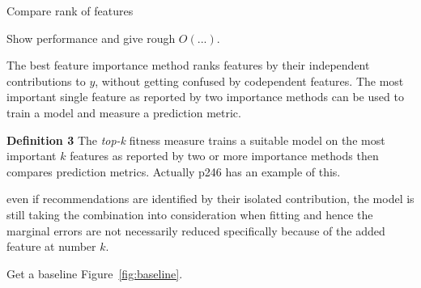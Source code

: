 \documentclass[11pt]{article}
\newcommand{\figref}[1]{Figure~\ref{#1}}
\newcommand{\todo}[1]{{{\color{red}{[#1]}}}}
\begin{document}
Compare rank of features

Show performance and give rough $O(...)$.

\todo{an experiment where we show insensitive to noise column and any other codependent ones that are thrown in but don't affect y}

\todo{what about outlier example}

\todo{stability is valuable. users would not trust results that changed significantly for small data set changes. show our error bars from bootstrapping and say we can do p-values.}


 
The best feature importance method ranks features by their independent contributions to $y$, without getting confused by codependent features. The most important single feature as reported by two importance methods can be used to train a model and measure a prediction metric.
 
{\bf Definition 3} The {\em top-k} fitness measure trains a suitable model on the  most important $k$ features as reported by two or more importance methods then compares prediction metrics. Actually p246 \citep{liu-fs} has an example of this.

even if recommendations are identified by their isolated contribution, the model is still taking the combination into consideration when fitting and hence the marginal errors are not necessarily reduced specifically because of the added feature at number $k$.

Get a baseline \figref{fig:baseline}.
\end{document}
